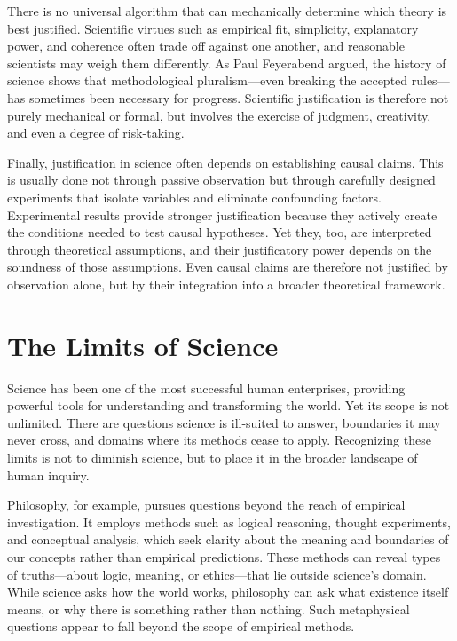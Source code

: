 There is no universal algorithm that can mechanically determine which theory is best justified. Scientific virtues such as empirical fit, simplicity, explanatory power, and coherence often trade off against one another, and reasonable scientists may weigh them differently. As Paul Feyerabend argued, the history of science shows that methodological pluralism—even breaking the accepted rules—has sometimes been necessary for progress. Scientific justification is therefore not purely mechanical or formal, but involves the exercise of judgment, creativity, and even a degree of risk-taking.

Finally, justification in science often depends on establishing causal claims. This is usually done not through passive observation but through carefully designed experiments that isolate variables and eliminate confounding factors. Experimental results provide stronger justification because they actively create the conditions needed to test causal hypotheses. Yet they, too, are interpreted through theoretical assumptions, and their justificatory power depends on the soundness of those assumptions. Even causal claims are therefore not justified by observation alone, but by their integration into a broader theoretical framework.

%
% 

\section{The Limits of Science}

Science has been one of the most successful human enterprises, providing powerful tools for understanding and transforming the world. Yet its scope is not unlimited. There are questions science is ill-suited to answer, boundaries it may never cross, and domains where its methods cease to apply. Recognizing these limits is not to diminish science, but to place it in the broader landscape of human inquiry.

Philosophy, for example, pursues questions beyond the reach of empirical investigation. It employs methods such as logical reasoning, thought experiments, and conceptual analysis, which seek clarity about the meaning and boundaries of our concepts rather than empirical predictions. These methods can reveal types of truths—about logic, meaning, or ethics—that lie outside science's domain. While science asks how the world works, philosophy can ask what existence itself means, or why there is something rather than nothing. Such metaphysical questions appear to fall beyond the scope of empirical methods.

